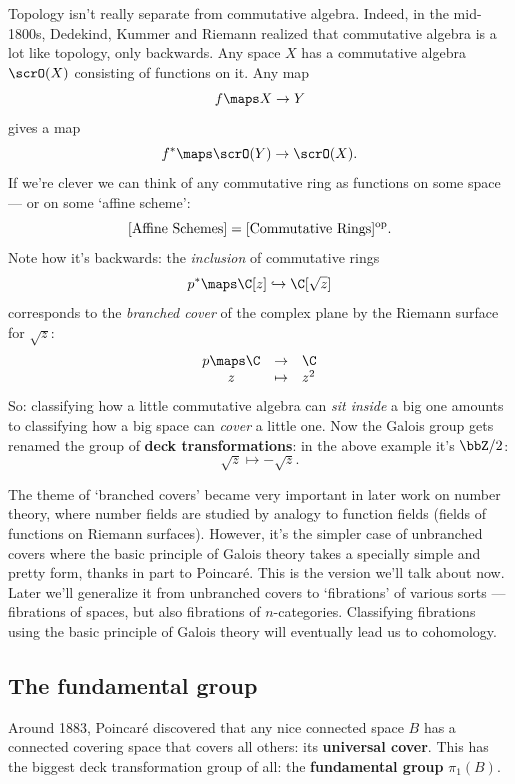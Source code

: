 \documentclass[12pt]{amsart}
\begin{document}
Topology isn't really separate from commutative algebra.
Indeed, in the mid-1800s, Dedekind, Kummer and Riemann realized that
commutative algebra is a lot like topology, only backwards.  Any space
$X$ has a commutative algebra $\scrO(X)$ consisting of functions on
it.  Any map
\[               f \maps X \to Y  \]
gives a map 
\[               f^\ast \maps \scrO(Y) \to \scrO(X)  .\]
If we're clever we can think of any commutative 
ring as functions on some space --- or on some `affine scheme':
\[   [\textrm{Affine Schemes}] = [\textrm{Commutative Rings}]^{\rm op}  .\]
Note how it's backwards: the {\it inclusion} of commutative rings
\[      p^\ast \maps \C[z] \hookrightarrow \C[\sqrt{z}]  \]
corresponds to the {\it branched cover} of the complex plane
by the Riemann surface for $\sqrt{z}$:
\[ 
\begin{array}{ccl}
         p \maps   \C &\to & \C    \\
              z &\mapsto& z^2 
\end{array}
\] 
So: classifying how a little commutative algebra can {\it sit inside} a 
big one amounts to classifying how a big space can {\it cover} a little one. 
Now the Galois group gets renamed the group of {\bf deck transformations}:
in the above example it's $\bbZ/2$:
\[              \sqrt{z} \mapsto -\sqrt{z}  .\]

The theme of `branched covers' became very important in later work on
number theory, where number fields are studied by analogy to function
fields (fields of functions on Riemann surfaces).  However, it's the
simpler case of unbranched covers where the basic principle of Galois
theory takes a specially simple and pretty form, thanks in part to
Poincar\'e.  This is the version we'll talk about now.  Later we'll 
generalize it from unbranched covers to `fibrations' of various sorts ---
fibrations of spaces, but also fibrations of $n$-categories.  Classifying
fibrations using the basic principle of Galois theory will eventually 
lead us to cohomology.

\subsection{The fundamental group}
\label{sec:fundamental group}

Around 1883, Poincar\'e discovered that any nice connected
space $B$ has a connected covering space 
that covers all others: its {\bf universal cover}.  This has
the biggest deck transformation group of all: the {\bf fundamental
group} $\pi_1(B)$.  
\end{document}

